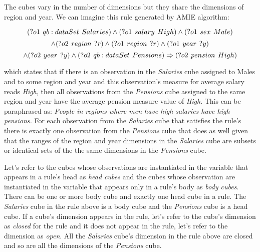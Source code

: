 The cubes vary in the number of dimensions but they share the dimensions of region and year. We can imagine this rule generated by AMIE algorithm:

$$
(?o1\hspace{0.4em}qb:dataSet\hspace{0.4em}Salaries) \land (?o1\hspace{0.4em}salary\hspace{0.4em}High) \land (?o1\hspace{0.4em}sex\hspace{0.4em}Male)
$$
$$
\land (?o2\hspace{0.4em}region\hspace{0.4em}?r) \land (?o1\hspace{0.4em}region\hspace{0.4em}?r) \land (?o1\hspace{0.4em}year\hspace{0.4em}?y)
$$
$$
\land (?o2\hspace{0.4em}year\hspace{0.4em}?y) \land (?o2\hspace{0.4em}qb:dataSet\hspace{0.4em}Pensions) \Rightarrow (?o2\hspace{0.4em}pension\hspace{0.4em}High)
$$

which states that if there is an observation in the \textit{Salaries} cube assigned to Males and to some region and year and this observation's measure for average salary reads \textit{High}, then all observations from the \textit{Pensions} cube assigned to the same region and year have the average pension measure value of \textit{High}. This can be paraphrased as: \textit{People in regions where men have high salaries have high pensions.} For each observation from the \textit{Salaries} cube that satisfies the rule's there is exactly one observation from the \textit{Pensions} cube that does as well given that the ranges of the region and year dimensions in the \textit{Salaries} cube are subsets or identical sets of the the same dimensions in the \textit{Pensions} cube. 

Let's refer to the cubes whose observations are instantiated in the variable that appears in a rule's head as \textit{head cubes} and the cubes whose observation are instantiated in the variable that appears only in a rule's body as \textit{body cubes}. There can be one or more body cube and exactly one head cube in a rule. The \textit{Salaries} cube in the rule above is a body cube and the \textit{Pensions} cube is a head cube. If a cube's dimension appears in the rule, let's refer to the cube's dimension as \textit{closed} for the rule and it does not appear in the rule, let's refer to the dimension as \textit{open}. All the \textit{Salaries} cube's dimension in the rule above are closed and so are all the dimensions of the \textit{Pensions} cube.

